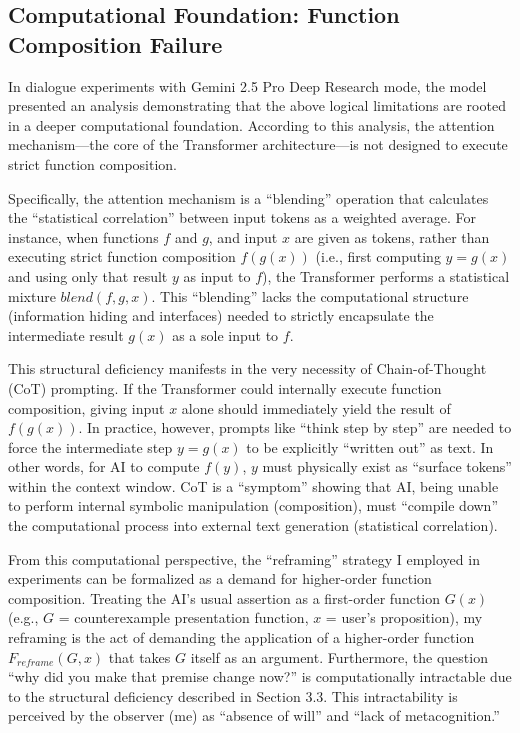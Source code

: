 \documentclass[11pt, a4paper]{article}
\begin{document}
\subsection{Computational Foundation: Function Composition Failure}
In dialogue experiments with Gemini 2.5 Pro Deep Research mode, the model presented an analysis demonstrating that the above logical limitations are rooted in a deeper computational foundation. According to this analysis, the attention mechanism—the core of the Transformer architecture—is not designed to execute strict function composition.

Specifically, the attention mechanism is a ``blending'' operation that calculates the ``statistical correlation'' between input tokens as a weighted average. For instance, when functions $f$ and $g$, and input $x$ are given as tokens, rather than executing strict function composition $f(g(x))$ (i.e., first computing $y = g(x)$ and using only that result $y$ as input to $f$), the Transformer performs a statistical mixture $blend(f, g, x)$. This ``blending'' lacks the computational structure (information hiding and interfaces) needed to strictly encapsulate the intermediate result $g(x)$ as a sole input to $f$.

This structural deficiency manifests in the very necessity of Chain-of-Thought (CoT) prompting. If the Transformer could internally execute function composition, giving input $x$ alone should immediately yield the result of $f(g(x))$. In practice, however, prompts like ``think step by step'' are needed to force the intermediate step $y = g(x)$ to be explicitly ``written out'' as text. In other words, for AI to compute $f(y)$, $y$ must physically exist as ``surface tokens'' within the context window. CoT is a ``symptom'' showing that AI, being unable to perform internal symbolic manipulation (composition), must ``compile down'' the computational process into external text generation (statistical correlation).

From this computational perspective, the ``reframing'' strategy I employed in experiments can be formalized as a demand for higher-order function composition. Treating the AI's usual assertion as a first-order function $G(x)$ (e.g., $G$ = counterexample presentation function, $x$ = user's proposition), my reframing is the act of demanding the application of a higher-order function $F_{reframe}(G, x)$ that takes $G$ itself as an argument. Furthermore, the question ``why did you make that premise change now?'' is computationally intractable due to the structural deficiency described in Section 3.3. This intractability is perceived by the observer (me) as ``absence of will'' and ``lack of metacognition.''
\end{document}
